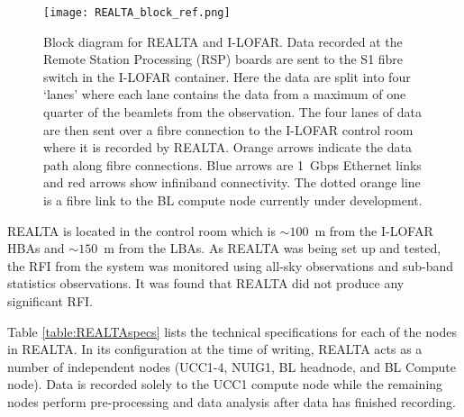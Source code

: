 \begin{figure}[h]
    \centering
    \texttt{[image: REALTA\_block\_ref.png]}
    \caption[Block diagram for REALTA and I-LOFAR.]{Block diagram for REALTA and I-LOFAR. Data recorded at the Remote Station Processing (RSP) boards are sent to the S1 fibre switch in the I-LOFAR container. Here the data are split into four `lanes' where each lane contains the data from a maximum of one quarter of the beamlets from the observation. The four lanes of data are then sent over a fibre connection to the I-LOFAR control room where it is recorded by REALTA. Orange arrows indicate the data path along fibre connections. Blue arrows are 1~Gbps Ethernet links and red arrows show infiniband connectivity. The dotted orange line is a fibre link to the BL compute node currently under development.}
    \label{fig:block}
\end{figure}

REALTA is located in the control room which is $\sim 100$~m from the I-LOFAR HBAs and $\sim 150$~m from the LBAs. As REALTA was being set up and tested, the RFI from the system was monitored using all-sky observations and sub-band statistics observations. It was found that REALTA did not produce any significant RFI.

Table \ref{table:REALTAspecs} lists the technical specifications for each of the nodes in REALTA. In its configuration at the time of writing, REALTA acts as a number of independent nodes (UCC1-4, NUIG1, BL headnode, and BL Compute node). Data is recorded solely to the UCC1 compute node while the remaining nodes perform pre-processing and data analysis after data has finished recording. 

